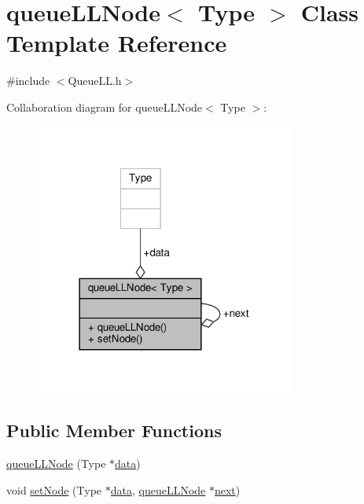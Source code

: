\hypertarget{classqueue_l_l_node}{}\section{queue\+L\+L\+Node$<$ Type $>$ Class Template Reference}
\label{classqueue_l_l_node}


{\ttfamily \#include $<$Queue\+L\+L.\+h$>$}



Collaboration diagram for queue\+L\+L\+Node$<$ Type $>$\+:
\nopagebreak
\begin{figure}[H]
\begin{center}
\leavevmode
\includegraphics[width=242pt]{classqueue_l_l_node__coll__graph}
\end{center}
\end{figure}
\subsection*{Public Member Functions}
\begin{DoxyCompactItemize}
\item 
\hyperlink{classqueue_l_l_node_a52a32e9e79f0b6cedeec1b9e68589354}{queue\+L\+L\+Node} (Type $\ast$\hyperlink{classqueue_l_l_node_a20b1170d8c5852b7dc01e56fda4e4206}{data})
\item 
void \hyperlink{classqueue_l_l_node_ac264831406ec126a6ece6b5522d89dcd}{set\+Node} (Type $\ast$\hyperlink{classqueue_l_l_node_a20b1170d8c5852b7dc01e56fda4e4206}{data}, \hyperlink{classqueue_l_l_node}{queue\+L\+L\+Node} $\ast$\hyperlink{classqueue_l_l_node_ab8367d61c51828d9f21d72537b62735f}{next})
\end{DoxyCompactItemize}
